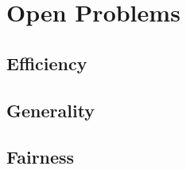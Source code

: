 \section{Open Problems} \label{sect:open-problems}


\subsection{Efficiency}


\subsection{Generality}

\subsection{Fairness}
